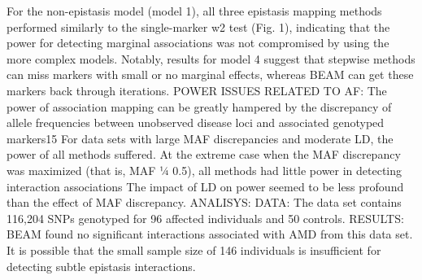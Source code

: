 	For the non-epistasis model (model 1), all three epistasis mapping methods performed similarly to the single-marker w2 test (Fig. 1), indicating that the power for detecting marginal associations was not compromised by using the more complex models. \cite{zhang2007bayesian}
	Notably, results for model 4 suggest that stepwise methods can miss markers with small or no marginal effects, whereas BEAM can get these markers back through iterations. \cite{zhang2007bayesian}
POWER ISSUES RELATED TO AF: 
	The power of association mapping can be greatly hampered by the discrepancy of allele frequencies between unobserved disease loci and associated genotyped markers15 \cite{zhang2007bayesian}
	For data sets with large MAF discrepancies and moderate LD, the power of all methods suffered.  \cite{zhang2007bayesian}
	At the extreme case when the MAF discrepancy was maximized (that is, MAF 1⁄4 0.5), all methods had little power in detecting interaction associations \cite{zhang2007bayesian}
	The impact of LD on power seemed to be less profound than the effect of MAF discrepancy.  \cite{zhang2007bayesian}
 ANALISYS:
	DATA: The data set contains 116,204 SNPs genotyped for 96 affected individuals and 50 controls. \cite{zhang2007bayesian}
	RESULTS: BEAM found no significant interactions associated with AMD from this data set. It is possible that the small sample size of 146 individuals is insufficient for detecting subtle epistasis interactions. \cite{zhang2007bayesian}


